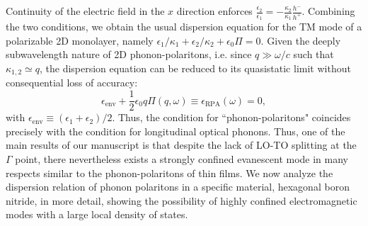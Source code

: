 \documentclass[aps,prb,twocolumn,
	           groupedaddress,superscriptaddress,
               amsfonts,amssymb,amsmath,floatfix,
	           citeautoscript]{revtex4-1}
\makeatletter
\newcommand{\ie}{i.e.\@\xspace} %
\newcommand{\comment}[2]{%
    \ifbool{togglecomments}%
    {\textcolor{blue!70!black}{\small\textsf{%
    \textsuperscript{\textsc{\textsf{\MakeLowercase{#1}}}}%
    [#2]}}} %
    {}}     %
\makeatother
\begin{document}
Continuity of the electric field in the $x$ direction enforces $\frac{\epsilon_2}{\epsilon_1} = -\frac{\kappa_2}{\kappa_1}\frac{h^-}{h^+}$. 
Combining the two conditions, we obtain the usual dispersion equation for the TM mode of a polarizable 2D monolayer, namely $\epsilon_1/\kappa_1 + \epsilon_2/\kappa_2 +\epsilon_0\Pi=0$. Given the deeply subwavelength nature of 2D phonon-polaritons, \ie since $q\gg\omega/c$ such that $\kappa_{1,2}\simeq q$, the dispersion equation can be reduced to its quasistatic limit without consequential loss of accuracy:
\begin{equation}
    \epsilon_{\mathrm{env}} + \frac{1}{2}\epsilon_0 q \Pi(q,\omega) \equiv \epsilon_{\mathrm{RPA}}(\omega) = 0,
    \label{eq:dispeq}
\end{equation}
with $\epsilon_{\mathrm{env}}\equiv (\epsilon_1+\epsilon_2)/2$. Thus, the condition for ``phonon-polaritons" coincides precisely with the condition for longitudinal optical phonons.  Thus, one of the main results of our manuscript is that despite the lack of LO-TO splitting at the $\Gamma$ point, there nevertheless exists a strongly confined evanescent mode in many respects similar to the phonon-polaritons of thin films. We now analyze the dispersion relation of phonon polaritons in a specific material, hexagonal boron nitride, in more detail, showing the possibility of highly confined electromagnetic modes with a large local density of states. %


\end{document}
